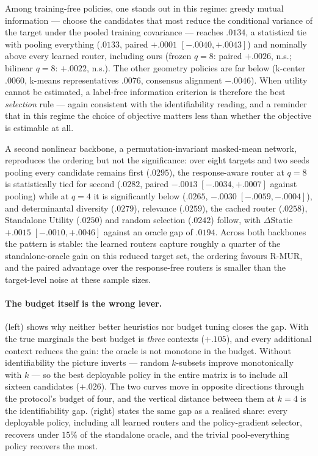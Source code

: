 Among training-free policies, one stands out in this regime: greedy mutual
information --- choose the candidates that most reduce the conditional variance
of the target under the pooled training covariance --- reaches $.0134$, a
statistical tie with pooling everything ($.0133$, paired $+.0001$
$[-.0040,+.0043]$) and nominally above every learned router, including ours
(frozen $q{=}8$: paired $+.0026$, n.s.; bilinear $q{=}8$: $+.0022$, n.s.). The
other geometry policies are far below (k-center $.0060$, k-means
representatives $.0076$, consensus alignment $-.0046$). When utility cannot be
estimated, a label-free information criterion is therefore the best \emph{selection}
rule --- again consistent with the identifiability reading, and a reminder that
in this regime the choice of objective matters less than whether the objective
is estimable at all.

A second nonlinear backbone, a permutation-invariant masked-mean network,
reproduces the ordering but not the significance: over eight targets and two
seeds pooling every candidate remains first ($.0295$), the response-aware
router at $q=8$ is statistically tied for second ($.0282$, paired
$-.0013\;[-.0034,+.0007]$ against pooling) while at $q=4$ it is significantly
below ($.0265$, $-.0030\;[-.0059,-.0004]$), and determinantal diversity
($.0279$), relevance ($.0259$), the cached router ($.0258$), Standalone Utility
($.0250$) and random selection ($.0242$) follow, with $\Delta$Static
$+.0015\;[-.0010,+.0046]$ against an oracle gap of $.0194$. Across both backbones the pattern is stable:
the learned routers capture roughly a quarter of the standalone-oracle gain on
this reduced target set, the ordering favours R-MUR, and the paired advantage
over the response-free routers is smaller than the target-level noise at these
sample sizes.

\paragraph{The budget itself is the wrong lever.}
 (left) shows why neither better heuristics nor budget
tuning closes the gap. With the true marginals the best budget is \emph{three}
contexts ($+.105$), and every additional context reduces the gain: the oracle is
not monotone in the budget. Without identifiability the picture inverts ---
random $k$-subsets improve monotonically with $k$ --- so the best deployable
policy in the entire matrix is to include all sixteen candidates ($+.026$). The
two curves move in opposite directions through the protocol's budget of four,
and the vertical distance between them at $k=4$ is the identifiability gap.
 (right) states the same gap as a realised share: every
deployable policy, including all learned routers and the policy-gradient
selector, recovers under $15\%$ of the standalone oracle, and the trivial
pool-everything policy recovers the most.

